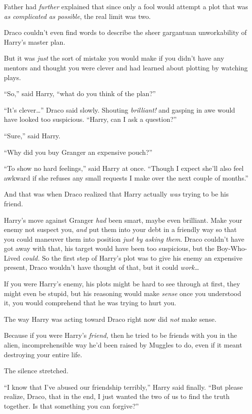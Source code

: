 Father had \emph{further} explained that since only a fool would attempt a plot that was \emph{as complicated as possible}, the real limit was two.

Draco couldn’t even find words to describe the sheer gargantuan unworkability of Harry’s master plan.

But it was \emph{just} the sort of mistake you would make if you didn’t have any mentors and thought you were clever and had learned about plotting by watching plays.

“So,” said Harry, “what do you think of the plan?”

“It’s clever…” Draco said slowly. Shouting \emph{brilliant!} and gasping in awe would have looked too suspicious. “Harry, can I ask a question?”

“Sure,” said Harry.

“Why did you buy Granger an expensive pouch?”

“To show no hard feelings,” said Harry at once. “Though I expect she’ll also feel awkward if she refuses any small requests I make over the next couple of months.”

And that was when Draco realized that Harry actually \emph{was} trying to be his friend.

Harry’s move against Granger \emph{had} been smart, maybe even brilliant. Make your enemy not suspect you, \emph{and} put them into your debt in a friendly way so that you could maneuver them into position \emph{just by asking them}. Draco couldn’t have got away with that, his target would have been too suspicious, but the Boy-Who-Lived \emph{could.} So the first step of Harry’s plot was to give his enemy an expensive present, Draco wouldn’t have thought of that, but it could \emph{work…}

If you were Harry’s enemy, his plots might be hard to see through at first, they might even be stupid, but his reasoning would make \emph{sense} once you understood it, you would comprehend that he was trying to hurt you.

The way Harry was acting toward Draco right now did \emph{not} make sense.

Because if you were Harry’s \emph{friend,} then he tried to be friends with you in the alien, incomprehensible way he’d been raised by Muggles to do, even if it meant destroying your entire life.

The silence stretched.

“I know that I’ve abused our friendship terribly,” Harry said finally. “But please realize, Draco, that in the end, I just wanted the two of us to find the truth together. Is that something you can forgive?”

